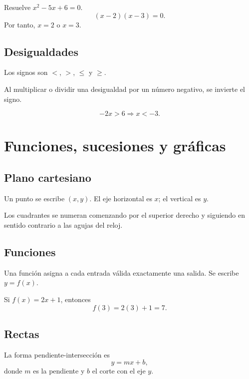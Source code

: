 \documentclass[10pt,oneside]{book}
\begin{document}
	\begin{ejemplo}
		Resuelve $x^2-5x+6=0$.
		\[
		(x-2)(x-3)=0.
		\]
		Por tanto, $x=2$ o $x=3$.
	\end{ejemplo}
	
	\section{Desigualdades}
	
	Los signos son $<$, $>$, $\leq$ y $\geq$.
	
	Al multiplicar o dividir una desigualdad por un número
	negativo, se invierte el signo.
	
	\begin{ejemplo}
		\[
		-2x>6\Longrightarrow x<-3.
		\]
	\end{ejemplo}
	
	\chapter{Funciones, sucesiones y gráficas}
	
	\section{Plano cartesiano}
	
	Un punto se escribe $(x,y)$.
	El eje horizontal es $x$; el vertical es $y$.
	
	Los cuadrantes se numeran comenzando por el superior derecho
	y siguiendo en sentido contrario a las agujas del reloj.
	
	\section{Funciones}
	
	Una función asigna a cada entrada válida exactamente una salida.
	Se escribe $y=f(x)$.
	
	\begin{ejemplo}
		Si $f(x)=2x+1$, entonces
		\[
		f(3)=2(3)+1=7.
		\]
	\end{ejemplo}
	
	\section{Rectas}
	
	La forma pendiente-intersección es
	\[
	y=mx+b,
	\]
	donde $m$ es la pendiente y $b$ el corte con el eje $y$.
	
\end{document}

